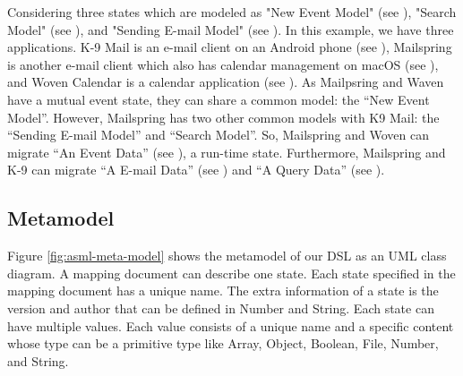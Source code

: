 Considering three states which are modeled as "New Event Model" (see \fcircfour), "Search Model" (see \fcircfive), and "Sending E-mail Model" (see \fcircsix). In this example, we have three applications. K-9 Mail is an e-mail client on an Android phone (see \fcircseven), Mailspring is another e-mail client which also has calendar management on macOS (see \fcirceight), and Woven Calendar is a calendar application (see \fcircnine). As Mailpsring and Waven have a mutual event state, they can share a common model: the “New Event Model”. However, Mailspring has two other common models with K9 Mail: the “Sending E-mail Model” and “Search Model”. So, Mailspring and Woven can migrate “An Event Data” (see \circone), a run-time state. Furthermore, Mailspring and K-9 can migrate “A E-mail Data” (see \circtwo) and “A Query Data” (see \circthree).

\subsection{Metamodel}
Figure \ref{fig:asml-meta-model} shows the metamodel of our DSL as an UML class diagram. A mapping document can describe one state. Each state specified in the mapping document has a unique name. The extra information of a state is the version and author that can be defined in Number and String. Each state can have multiple values. Each value consists of a unique name and a specific content whose type can be a primitive type like Array, Object, Boolean, File, Number, and String. 

